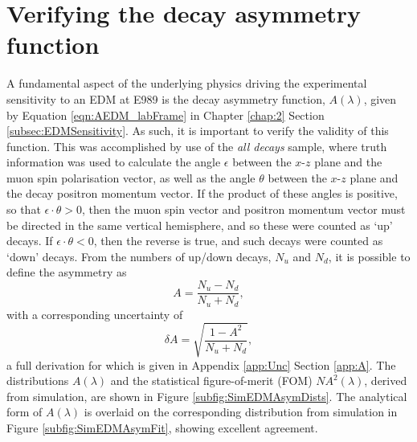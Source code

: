 \section{Verifying the decay asymmetry function}\label{sec:DecayAsymVerification}

A fundamental aspect of the underlying physics driving the experimental sensitivity to an EDM at E989 is the decay asymmetry function, $A(\lambda)$, given by Equation \ref{eqn:AEDM_labFrame} in Chapter \ref{chap:2} Section \ref{subsec:EDMSensitivity}. As such, it is important to verify the validity of this function. This was accomplished by use of the \textit{all decays} sample, where truth information was used to calculate the angle $\epsilon$ between the $x$-$z$ plane and the muon spin polarisation vector, as well as the angle $\theta$ between the $x$-$z$ plane and the decay positron momentum vector. If the product of these angles is positive, so that $\epsilon\cdot\theta > 0$, then the muon spin vector and positron momentum vector must be directed in the same vertical hemisphere, and so these were counted as `up' decays. If $\epsilon\cdot\theta < 0$, then the reverse is true, and such decays were counted as `down' decays. From the numbers of up/down decays, $N_{u}$ and $N_{d}$, it is possible to define the asymmetry as 
%
\begin{equation}
  A = \frac{N_{u}-N_{d}}{N_{u}+N_{d}},
  \label{eqn:UpDownAsym}
\end{equation}
%
with a corresponding uncertainty of 
\begin{equation}
  \delta A = \sqrt{\frac{1-A^{2}}{N_{u}+N_{d}}},
  \label{eqn:UpDownAsymError}
\end{equation}
%
a full derivation for which is given in Appendix \ref{app:Unc} Section \ref{app:A}. The distributions $A(\lambda)$ and the statistical figure-of-merit (FOM) $NA^{2}(\lambda)$, derived from simulation, are shown in Figure \ref{subfig:SimEDMAsymDists}. The analytical form of $A(\lambda)$ is overlaid on the corresponding distribution from simulation in Figure \ref{subfig:SimEDMAsymFit}, showing excellent agreement. 


